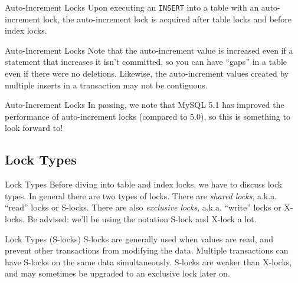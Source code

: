 \documentclass[14pt]{beamer}
\begin{document}
\begin{frame}{Auto-Increment Locks}
  Upon executing an \texttt{INSERT} into a table with an auto-increment lock,
  the auto-increment lock is acquired after table locks and before index
  locks.
\end{frame}

\begin{frame}{Auto-Increment Locks}
  Note that the auto-increment value is increased even if a statement that
  increases it isn't committed, so you can have ``gaps'' in a table even if
  there were no deletions.
  \newline
  \newline
  \pause
  Likewise, the auto-increment values created by multiple inserts in a
  transaction may not be contiguous.
\end{frame}

\begin{frame}{Auto-Increment Locks}
  In passing, we note that MySQL 5.1 has improved the performance of
  auto-increment locks (compared to 5.0), so this is something to look forward
  to!
\end{frame}

\subsection{Lock Types}

\begin{frame}{Lock Types}
  Before diving into table and index locks, we have to discuss lock types. In
  general there are two types of locks. There are \emph{shared locks},
  a.k.a. ``read'' locks or S-locks.
  \newline
  \newline
  There are also \emph{exclusive locks}, a.k.a. ``write'' locks or X-locks.
  \newline
  \newline
  \pause
  Be advised: we'll be using the notation S-lock and X-lock a lot.
\end{frame}

\begin{frame}{Lock Types (S-locks)}
  S-locks are generally used when values are read, and prevent other
  transactions from modifying the data. Multiple transactions can have S-locks
  on the same data simultaneously.
  \newline
  \newline
  S-locks are weaker than X-locks, and may sometimes be upgraded to
  an exclusive lock later on.
\end{frame}
\end{document}
